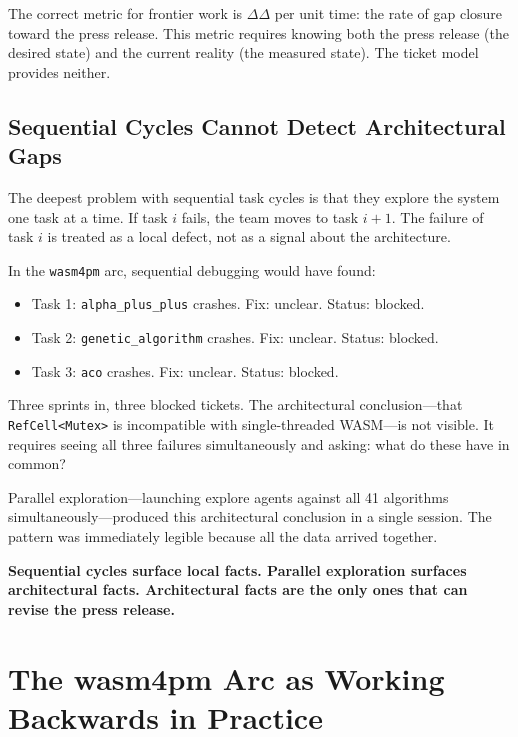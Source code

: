 \documentclass[11pt,a4paper]{article}
\newcommand{\code}[1]{\texttt{#1}}
\newcommand{\gap}{\Delta}
\begin{document}
The correct metric for frontier work is $\Delta\gap$ per unit time: the rate
of gap closure toward the press release.  This metric requires knowing both
the press release (the desired state) and the current reality (the measured
state).  The ticket model provides neither.

\subsection{Sequential Cycles Cannot Detect Architectural Gaps}

The deepest problem with sequential task cycles is that they explore the
system one task at a time.  If task $i$ fails, the team moves to task $i+1$.
The failure of task $i$ is treated as a local defect, not as a signal about
the architecture.

In the \code{wasm4pm} arc, sequential debugging would have found:
\begin{itemize}
  \item Task 1: \code{alpha\_plus\_plus} crashes. Fix: unclear. Status: blocked.
  \item Task 2: \code{genetic\_algorithm} crashes. Fix: unclear. Status: blocked.
  \item Task 3: \code{aco} crashes. Fix: unclear. Status: blocked.
\end{itemize}

Three sprints in, three blocked tickets.  The architectural conclusion---that
\code{RefCell<Mutex>} is incompatible with single-threaded WASM---is not
visible.  It requires seeing all three failures simultaneously and asking:
what do these have in common?

Parallel exploration---launching explore agents against all 41 algorithms
simultaneously---produced this architectural conclusion in a single session.
The pattern was immediately legible because all the data arrived together.

\textbf{Sequential cycles surface local facts.  Parallel exploration surfaces
architectural facts.  Architectural facts are the only ones that can revise the
press release.}

\section{The wasm4pm Arc as Working Backwards in Practice}
\end{document}
